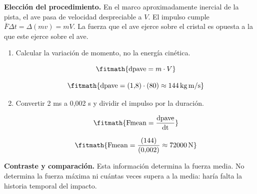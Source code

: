 \noindent\textbf{Elección del procedimiento.} En el marco aproximadamente inercial de la pista, el ave pasa de velocidad despreciable a $V$. El impulso cumple $\bar F\Delta t=\Delta(mv)=mV$. La fuerza que el ave ejerce sobre el cristal es opuesta a la que este ejerce sobre el ave.

\begin{enumerate}

\item Calcular la variación de momento, no la energía cinética.

\[\fitmath{\mathrm{dpave}=m\cdot V}\]

\[\fitmath{\mathrm{dpave}=(1{,}8)\cdot (80)\approx 144\,\mathrm{kg\,m/s}}\]

\item Convertir 2 ms a 0,002 s y dividir el impulso por la duración.

\[\fitmath{\mathrm{Fmean}=\frac{\mathrm{dpave}}{\mathrm{dt}}}\]

\[\fitmath{\mathrm{Fmean}=\frac{(144)}{(0{,}002)}\approx 72000\,\mathrm{N}}\]

\end{enumerate}

\noindent\textbf{Contraste y comparación.} Esta información determina la fuerza media. No determina la fuerza máxima ni cuántas veces supera a la media: haría falta la historia temporal del impacto.
